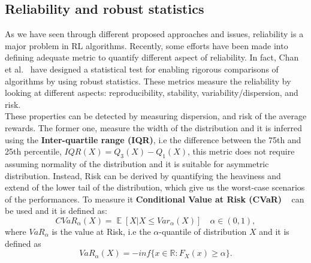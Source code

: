 \documentclass{article}
\DeclareMathOperator{\EX}{\mathbb{E}}%
\begin{document}
\subsection{Reliability and robust statistics}
As we have seen through different proposed approaches and issues, reliability is a major problem in RL algorithms. Recently, some efforts have been made into defining adequate metric to quantify different aspect of reliability. In fact, Chan et al.~\cite{GoogleMeasure} have designed a statistical test for enabling rigorous comparisons of algorithms by using robust statistics. These metrics measure the reliability by looking at different aspects: reproducibility, stability, variability/dispersion, and risk.\\ These properties can be detected by measuring dispersion, and risk of the average rewards. The former one, measure the width of the distribution and it is inferred using the \textbf{Inter-quartile range (IQR)}, i.e the difference between the 75th and 25th percentile, $ IQR(X) = Q_3(X) - Q_1(X)$, this metric does not require assuming normality of the distribution and it is suitable for asymmetric distribution.
Instead, Risk can be derived by quantifying the heaviness and extend of the lower tail of the distribution, which give us the worst-case scenarios of the performances. To measure it \textbf{Conditional Value at Risk (CVaR)} ~\cite{Cvar} can be used and it is defined as:
\begin{equation}
CVaR_\alpha(X) = \EX \left[ X \vert X \leq Var_\alpha(X) \right]  \quad \alpha \in (0,1),
\end{equation}
where $VaR_\alpha$ is the value at Risk, i.e the $\alpha$-quantile of distribution $X$ and it is defined as
\begin{equation}
VaR_\alpha(X) = -inf \{ x \in \mathbb{R}: F_X(x) \ge \alpha \}.
\end{equation}
\end{document}
